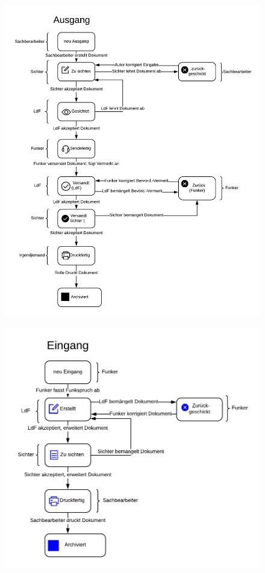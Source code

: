 \documentclass[a4paper,11pt,oneside, titlepage]{article}
\begin{document}
	\begin{figure}[htpb]

	\centering
	\includegraphics[width=0.8\linewidth]{HBausgang.png}
	\caption{}

	\end{figure}
	\newpage	
	\begin{figure}[htpb]
		\centering
		\includegraphics[width=0.8\linewidth]{HBeingang.png}
		\caption{}
	\end{figure}
	
\end{document}
